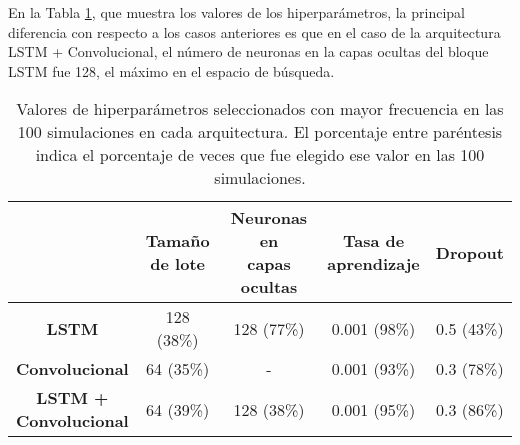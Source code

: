 \documentclass[../../main.tex]{subfiles}
\begin{document}
En la Tabla \ref{tab:hyperparams_exp6}, que muestra los valores de los hiperparámetros,
la principal diferencia con respecto a los casos anteriores es que en el caso de la
arquitectura LSTM + Convolucional, el número de neuronas en la capas ocultas del bloque LSTM
fue 128, el máximo en el espacio de búsqueda.

\begin{table}[H]
    \centering
    \renewcommand{\arraystretch}{1.2}
    \begin{tabular}{|c|c|c|c|c|}
        \hline
            & \makecell{\textbf{Tamaño}\\\textbf{de lote}}
            & \makecell{\textbf{Neuronas en}\\\textbf{capas ocultas}}
            & \makecell{\textbf{Tasa de}\\\textbf{aprendizaje}}
            & \textbf{Dropout} \\ \hline\hline
        \textbf{LSTM}
            & 128 (38\%) & 128 (77\%) & 0.001 (98\%) & 0.5 (43\%) \\ \hline
        \textbf{Convolucional}
            & 64 (35\%) & -           & 0.001 (93\%) & 0.3 (78\%) \\ \hline
        \makecell{\textbf{LSTM +}\\\textbf{Convolucional}}
            & 64 (39\%) & 128 (38\%)  & 0.001 (95\%) & 0.3 (86\%) \\
        \hline
    \end{tabular}
    \caption{Valores de hiperparámetros seleccionados con mayor frecuencia en las 100
    simulaciones en cada arquitectura. El porcentaje entre paréntesis indica el porcentaje
    de veces que fue elegido ese valor en las 100 simulaciones.}
    \label{tab:hyperparams_exp6}
\end{table}
\end{document}
